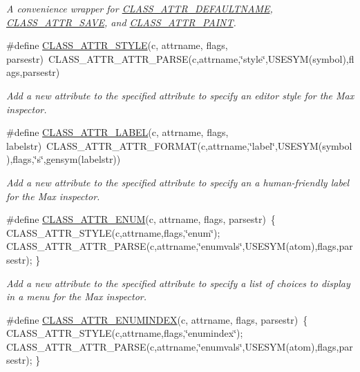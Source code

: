 \begin{DoxyCompactItemize}
\begin{DoxyCompactList}\small\item\em A convenience wrapper for \hyperlink{group__attr_gaf6ee00a905a84d18172a212667cfa4cb}{CLASS\_\-ATTR\_\-DEFAULTNAME}, \hyperlink{group__attr_gaf56dc31d0defad3cdc1ee60b611acc79}{CLASS\_\-ATTR\_\-SAVE}, and \hyperlink{group__attr_gaee847156d2c156b4c9f73652b6059500}{CLASS\_\-ATTR\_\-PAINT}. \item\end{DoxyCompactList}\item 
\#define \hyperlink{group__attr_ga16521ec1560a294041e78dacf6f8e4ee}{CLASS\_\-ATTR\_\-STYLE}(c, attrname, flags, parsestr)~CLASS\_\-ATTR\_\-ATTR\_\-PARSE(c,attrname,\char`\"{}style\char`\"{},USESYM(symbol),flags,parsestr)
\begin{DoxyCompactList}\small\item\em Add a new attribute to the specified attribute to specify an editor style for the Max inspector. \item\end{DoxyCompactList}\item 
\#define \hyperlink{group__attr_gad46aeee11e8b4786332ce4ff43963326}{CLASS\_\-ATTR\_\-LABEL}(c, attrname, flags, labelstr)~CLASS\_\-ATTR\_\-ATTR\_\-FORMAT(c,attrname,\char`\"{}label\char`\"{},USESYM(symbol),flags,\char`\"{}s\char`\"{},gensym(labelstr))
\begin{DoxyCompactList}\small\item\em Add a new attribute to the specified attribute to specify an a human-\/friendly label for the Max inspector. \item\end{DoxyCompactList}\item 
\#define \hyperlink{group__attr_gaababb47839dc4396bddfbf8149214e21}{CLASS\_\-ATTR\_\-ENUM}(c, attrname, flags, parsestr)~\{ CLASS\_\-ATTR\_\-STYLE(c,attrname,flags,\char`\"{}enum\char`\"{}); CLASS\_\-ATTR\_\-ATTR\_\-PARSE(c,attrname,\char`\"{}enumvals\char`\"{},USESYM(atom),flags,parsestr); \}
\begin{DoxyCompactList}\small\item\em Add a new attribute to the specified attribute to specify a list of choices to display in a menu for the Max inspector. \item\end{DoxyCompactList}\item 
\#define \hyperlink{group__attr_gad0376b4f50f83ddd560e303330ec6427}{CLASS\_\-ATTR\_\-ENUMINDEX}(c, attrname, flags, parsestr)~\{ CLASS\_\-ATTR\_\-STYLE(c,attrname,flags,\char`\"{}enumindex\char`\"{}); CLASS\_\-ATTR\_\-ATTR\_\-PARSE(c,attrname,\char`\"{}enumvals\char`\"{},USESYM(atom),flags,parsestr); \}

\end{DoxyCompactItemize}
